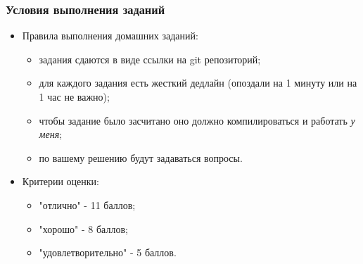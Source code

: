 \begin{frame}
\frametitle{Условия выполнения заданий}
\begin{itemize}
  \item Правила выполнения домашних заданий:
  \begin{itemize}
    \item задания сдаются в виде ссылки на git репозиторий;
    \item для каждого задания есть жесткий дедлайн (опоздали на 1 минуту или на
    1 час не важно);
    \item чтобы задание было засчитано оно должно компилироваться и работать
    \emph{у меня};
    \item по вашему решению будут задаваться вопросы.
  \end{itemize}
  \item Критерии оценки:
  \begin{itemize}
    \item "отлично" - 11 баллов;
    \item "хорошо" - 8 баллов;
    \item "удовлетворительно" - 5 баллов.
  \end{itemize}
\end{itemize}
\end{frame}
